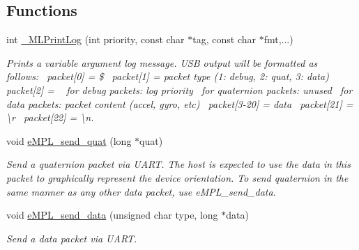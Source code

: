 \subsection*{Functions}
\begin{DoxyCompactItemize}
\item 
int \hyperlink{group___m_s_p430___system___layer_ga1b638933f33e37f42042f64cbc408821}{\+\_\+\+M\+L\+Print\+Log} (int priority, const char $\ast$tag, const char $\ast$fmt,...)
\begin{DoxyCompactList}\small\item\em Prints a variable argument log message. U\+S\+B output will be formatted as follows\+:~\newline
packet\mbox{[}0\mbox{]} = \$~\newline
packet\mbox{[}1\mbox{]} = packet type (1\+: debug, 2\+: quat, 3\+: data)~\newline
packet\mbox{[}2\mbox{]} = ~\newline
 for debug packets\+: log priority~\newline
 for quaternion packets\+: unused~\newline
 for data packets\+: packet content (accel, gyro, etc)~\newline
packet\mbox{[}3-\/20\mbox{]} = data~\newline
packet\mbox{[}21\mbox{]} = \textbackslash{}r~\newline
packet\mbox{[}22\mbox{]} = \textbackslash{}n. \end{DoxyCompactList}\item 
void \hyperlink{group___m_s_p430___system___layer_gac781b96a931ab4eb1ad191ce53e4f0d1}{e\+M\+P\+L\+\_\+send\+\_\+quat} (long $\ast$quat)
\begin{DoxyCompactList}\small\item\em Send a quaternion packet via U\+A\+R\+T. The host is expected to use the data in this packet to graphically represent the device orientation. To send quaternion in the same manner as any other data packet, use e\+M\+P\+L\+\_\+send\+\_\+data. \end{DoxyCompactList}\item 
void \hyperlink{group___m_s_p430___system___layer_ga6eb41d95d28b12994f2722bda7fab49d}{e\+M\+P\+L\+\_\+send\+\_\+data} (unsigned char type, long $\ast$data)
\begin{DoxyCompactList}\small\item\em Send a data packet via U\+A\+R\+T. \end{DoxyCompactList}\end{DoxyCompactItemize}


